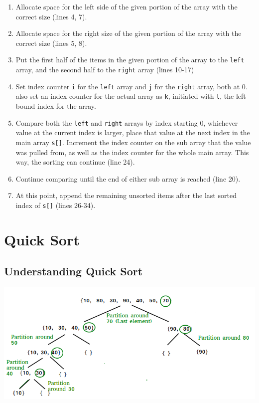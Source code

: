 \documentclass[letterpaper, 10pt]{article}
\begin{document}
\begin{enumerate}
    \item Allocate space for the left side of the given portion of the array with the correct size (lines 4, 7).
    \item Allocate space for the right size of the given portion of the array with the correct size (lines 5, 8).
    \item Put the first half of the items in the given portion of the array to the \texttt{left} array, and the second half to the \texttt{right} array (lines 10-17)
    \item Set index counter \texttt{i} for the \texttt{left} array and \texttt{j} for the \texttt{right} array, both at 0. also set an index counter for the actual array as \texttt{k}, initiated with \texttt{l}, the left bound index for the array.
    \item Compare both the \texttt{left} and \texttt{right} arrays by index starting 0, whichever value at the current index is larger, place that value at the next index in the main array \texttt{s[]}. Increment the index counter on the sub array that the value was pulled from, as well as the index counter for the whole main array. This way, the sorting can continue (line 24).
    \item Continue comparing until the end of either sub array is reached (line 20).
    \item At this point, append the remaining unsorted items after the last sorted index of \texttt{s[]} (lines 26-34).
    
   
\end{enumerate}


\section{Quick Sort}
\subsection{Understanding Quick Sort}
\begin{center}
\includegraphics[width=\textwidth]{img/QuickSort.png}
\end{center}
\end{document}
